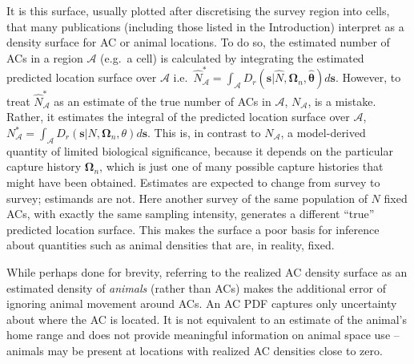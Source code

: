 \documentclass[useAMS,usenatbib,referee]{biom}
\begin{document}
It is this surface, usually plotted after discretising the survey region into cells, that many publications (including those listed in the Introduction) interpret as a density surface for AC or animal locations. To do so, the estimated number of ACs in a region $\mathcal{A}$ (e.g.\ a cell) is calculated by integrating the estimated predicted location surface over $\mathcal{A}$ i.e.\ $\hat{N}^*_{\mathcal{A}} = \int_{\mathcal{A}} D_r(\bm{s}|\hat{N},\bm{\Omega}_n,\hat{\bm{\theta}}) d\bm{s}$. However, to treat $\hat{N}^*_{\mathcal{A}}$ as an estimate of the true number of ACs in $\mathcal{A}$, $N_{\mathcal{A}}$, is a mistake. Rather, it estimates the integral of the predicted location surface over $\mathcal{A}$, $N^*_{\mathcal{A}}=\int_{\mathcal{A}} D_r(\bm{s}|N,\bm{\Omega}_n, \theta) d\bm{s}$. This is, in contrast to $N_{\mathcal{A}}$, a model-derived quantity of limited biological significance, because it depends on the particular capture history $\bm{\Omega}_n$, which is just one of many possible capture histories that might have been obtained. Estimates are expected to change from survey to survey; estimands are not. Here another survey of the same population of $N$ fixed ACs, with exactly the same sampling intensity, generates a different ``true'' predicted location surface. This makes the surface a poor basis for inference about quantities such as animal densities that are, in reality, fixed.

While perhaps done for brevity, referring to the realized AC density surface as an estimated density of {\it animals} (rather than ACs) makes the additional error of ignoring animal movement around ACs. An AC PDF captures only uncertainty about where the AC is located. It is not equivalent to an estimate of the animal's home range and does not provide meaningful information on animal space use --  animals may be present at locations with realized AC densities close to zero.

\end{document}
